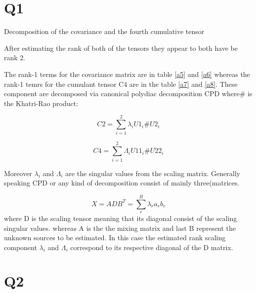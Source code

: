 \section{Q1}
Decomposition of the covariance and the fourth cumulative tensor


After estimating the rank of both of the tensors they appear to both have be rank 2. 

The rank-1 terms for the covariance matrix are in table \ref{a5} and \ref{a6} whereas the rank-1 temrs for the cumulant tensor C4 are in the table \ref{a7} and \ref{a8}.
These component are decomposed via canonical polydiac decomposition CPD where$\#$ is the Khatri-Rao product:

\begin{equation}
C2=\sum_{i=1}^{2}\lambda_{i}U1_{i}\#U2_{i}
\end{equation}

\begin{equation}
C4=\sum_{i=1}^{2}\Lambda_{i}U11_{i}\#U22_{i}
\end{equation}

Moreover $\lambda_{i}$ and $\Lambda_{i}$ are the singular values from the scaling matrix. Generally speaking CPD or any kind of decomposition consist of mainly three(matrices.

\begin{equation}
X=ADB^T=\sum_{r}^{R}\lambda_{r}a_{r}b_{r}
\end{equation}
where D is the scaling tensor meaning that its diagonal consist of the scaling singular values. whereas A is the the mixing matrix and last B represent the unknown sources to be estimated\cite{19}. In this case the estimated rank scaling component $\lambda_{i}$ and $\Lambda_{i}$ correspond to its respective diagonal of the D matrix.

\section{Q2}

